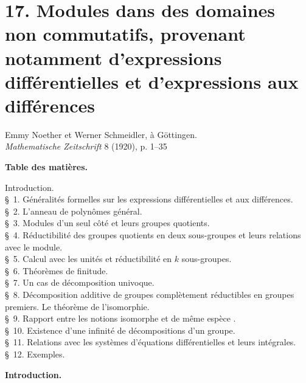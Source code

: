 \section*{17. Modules dans des domaines non commutatifs, provenant notamment d'expressions différentielles et d'expressions aux différences}
\begin{center}
Emmy Noether et Werner Schmeidler, à Göttingen.\\[0.65em]
\emph{Mathematische Zeitschrift} 8 (1920), p. 1--35
\end{center}

\begin{center}
\textbf{Table des matières.}
\end{center}
\begin{center}
\begin{minipage}{0.84\linewidth}
Introduction.\\
\S~1. Généralités formelles sur les expressions différentielles et aux différences.\\
\S~2. L'anneau de polynômes général.\\
\S~3. Modules d'un seul côté et leurs groupes quotients.\\
\S~4. Réductibilité des groupes quotients en deux sous-groupes et leurs relations avec le module.\\
\S~5. Calcul avec les unités et réductibilité en $k$ sous-groupes.\\
\S~6. Théorèmes de finitude.\\
\S~7. Un cas de décomposition univoque.\\
\S~8. Décomposition additive de groupes complètement réductibles en groupes premiers. Le théorème de l'isomorphie.\\
\S~9. Rapport entre les notions \og{} isomorphe \fg{} et \og{} de même espèce \fg{}.\\
\S~10. Existence d'une infinité de décompositions d'un groupe.\\
\S~11. Relations avec les systèmes d'équations différentielles et leurs intégrales.\\
\S~12. Exemples.
\end{minipage}
\end{center}

\begin{center}\textbf{Introduction.}\end{center}

